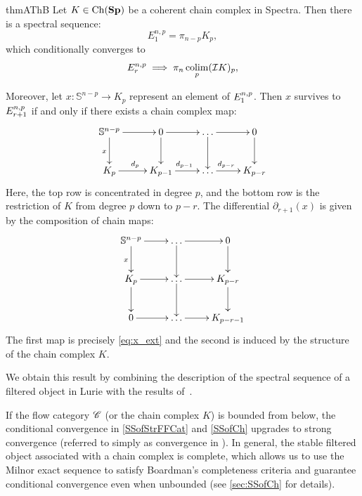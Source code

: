 \begin{restatable}{thmA}{ThB}\label{SSofCh}
    Let $K \in \operatorname{Ch}(\mathbf{Sp})$ be a coherent chain complex in Spectra. Then there is a spectral sequence:
    \begin{equation*}
        E_1^{n,p} = \pi_{n - p} K_p,
    \end{equation*}
    which conditionally converges to
    \begin{equation*}
        E_r^{n,p} \implies \pi_n \operatorname*{colim}_p (\mathcal{I} K)_p,
    \end{equation*}
    
    Moreover, let $x: \mathbb{S}^{n - p} \to K_p$ represent an element of $E_{1}^{n,p}$. Then $x$ survives to $E_{r+1}^{n,p}$ if and only if there exists a chain complex map:
    \begin{equation}\label{eq:x_ext}
        \xymatrix{
        \mathbb{S}^{n - p} \ar[d]_{x} \ar[r] & 0 \ar[r]\ar[d] & \dots \ar[r]\ar[d]& 0\ar[d]\\
        K_p \ar[r]^{d_p}& K_{p - 1} \ar[r]^{d_{p - 1}}& \dots \ar[r]^{d_{p - r} \quad}& K_{p - r}
        }
    \end{equation}
    Here, the top row is concentrated in degree $p$, and the bottom row is the restriction of $K$ from degree $p$ down to $p-r$.
    The differential $\partial_{r+1}(x)$ is given by the composition of chain maps:
    \begin{equation*}
        \xymatrix
        {   \mathbb{S}^{n-p} \ar[r]\ar[d]_x & \dots \ar[r]\ar[d] &  0 \ar[d]\\
            K_p \ar[r]\ar[d] & \dots \ar[r]\ar[d] &  K_{p-r} \ar[d] \\
            0 \ar[r] & \dots \ar[r] & K_{p-r-1} 
        }
    \end{equation*}
    The first map is precisely \cref{eq:x_ext} and the second is induced by the structure of the chain complex $K$.
\end{restatable}

We obtain this result by combining the description of the spectral sequence of a filtered object in Lurie \cite{Lur17} with the results of~\cite{Ari21}.

\begin{rem}\label{rem:convergence}
    If the flow category $\mathscr{C}$ (or the chain complex $K$) is bounded from below, the conditional convergence in \cref{SSofStrFFCat} and \cref{SSofCh} upgrades to strong convergence (referred to simply as convergence in \cite[Prop.\ 1.2.2.14]{Lur17}). In general, the stable filtered object associated with a chain complex is complete, which allows us to use the Milnor exact sequence to satisfy Boardman's completeness criteria \cite[Def.\ 5.10]{Boa99} and guarantee conditional convergence even when unbounded (see \cref{sec:SSofCh} for details).
\end{rem}

